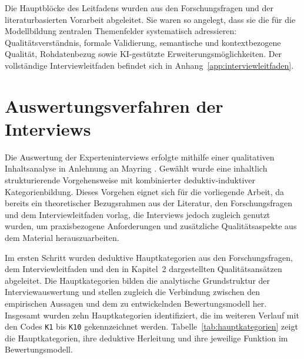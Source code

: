 Die Hauptblöcke des Leitfadens wurden aus den Forschungsfragen und der literaturbasierten Vorarbeit abgeleitet. Sie waren so angelegt, dass sie die für die Modellbildung zentralen Themenfelder systematisch adressieren: Qualitätsverständnis, formale Validierung, semantische und kontextbezogene Qualität, Rohdatenbezug sowie KI-gestützte Erweiterungsmöglichkeiten. Der vollständige Interviewleitfaden befindet sich in Anhang~\ref{app:interviewleitfaden}.

\section{Auswertungsverfahren der Interviews}

Die Auswertung der Experteninterviews erfolgte mithilfe einer qualitativen Inhaltsanalyse in Anlehnung an Mayring \cite{Mayring2014, Mayring2015}. Gewählt wurde eine inhaltlich strukturierende Vorgehensweise mit kombinierter deduktiv-induktiver Kategorienbildung. Dieses Vorgehen eignet sich für die vorliegende Arbeit, da bereits ein theoretischer Bezugsrahmen aus der Literatur, den Forschungsfragen und dem Interviewleitfaden vorlag, die Interviews jedoch zugleich genutzt wurden, um praxisbezogene Anforderungen und zusätzliche Qualitätsaspekte aus dem Material herauszuarbeiten.

Im ersten Schritt wurden deduktive Hauptkategorien aus den Forschungsfragen, dem Interviewleitfaden und den in Kapitel~2 dargestellten Qualitätsansätzen abgeleitet. Die Hauptkategorien bilden die analytische Grundstruktur der Interviewauswertung und stellen zugleich die Verbindung zwischen den empirischen Aussagen und dem zu entwickelnden Bewertungsmodell her. Insgesamt wurden zehn Hauptkategorien identifiziert, die im weiteren Verlauf mit den Codes \texttt{K1} bis \texttt{K10} gekennzeichnet werden. Tabelle~\ref{tab:hauptkategorien} zeigt die Hauptkategorien, ihre deduktive Herleitung und ihre jeweilige Funktion im Bewertungsmodell.

